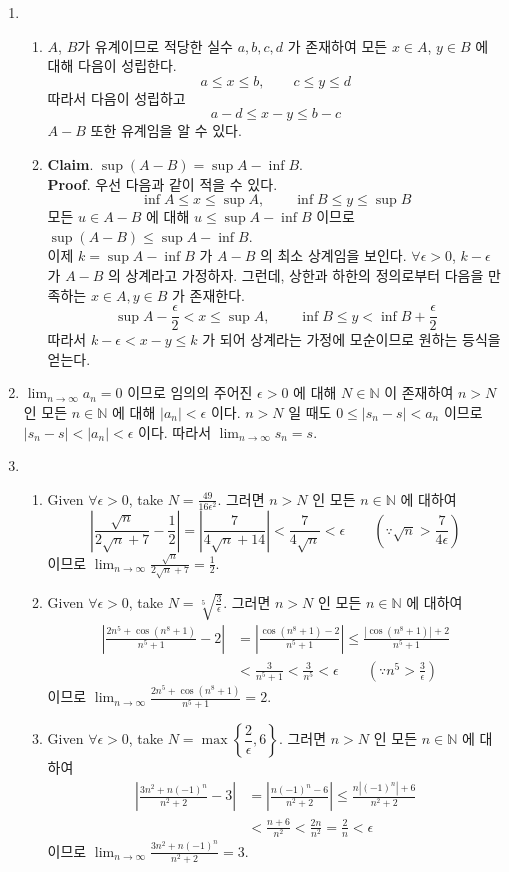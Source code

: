 \documentclass[12pt]{report}
\newcommand{\numl}[1]{\item[\large\textbf{\sffamily #1.}]}
\newcommand{\num}[1]{\item[\textbf{\sffamily #1}]}
\newcommand{\bb}[1]{\mathbb{#1}}
\newcommand{\ra}{\rightarrow}
\newcommand{\abs}[1]{\left|#1\right|}
\newcommand{\ds}{\displaystyle}
\begin{document}
\begin{enumerate}
\numl{3}
\begin{enumerate}
	\num{(1)} $A$, $B$가 유계이므로 적당한 실수 $a, b, c, d$ 가 존재하여 모든 $x \in A$, $y\in B$ 에 대해 다음이 성립한다. $$a\leq x\leq b, \qquad c\leq y\leq d$$ 따라서 다음이 성립하고 $$a-d\leq x-y\leq b-c$$ $A-B$ 또한 유계임을 알 수 있다.
	\num{(2)} \textbf{Claim}. $\sup(A-B) = \sup A-\inf B$.\\ \textbf{Proof}. 우선 다음과 같이 적을 수 있다. $$\inf A\leq x\leq \sup A, \qquad \inf B\leq y\leq \sup B$$ 모든 $u \in A-B$ 에 대해 $u \leq \sup A - \inf B$ 이므로 $\sup(A-B) \leq \sup A - \inf B$.\\ 이제 $k = \sup A - \inf B$ 가 $A-B$ 의 최소 상계임을 보인다. $\forall \epsilon > 0$, $k - \epsilon$ 가 $A-B$ 의 상계라고 가정하자. 그런데, 상한과 하한의 정의로부터 다음을 만족하는 $x \in A, y \in B$ 가 존재한다. $$\sup A - \frac{\epsilon}{2} < x \leq \sup A, \qquad \inf B \leq y < \inf B + \frac{\epsilon}{2}$$ 따라서 $k - \epsilon < x-y \leq k$ 가 되어 상계라는 가정에 모순이므로 원하는 등식을 얻는다.
\end{enumerate}

\numl{4} $\ds \lim_{n \ra \infty} a_n = 0$ 이므로 임의의 주어진 $\epsilon > 0$ 에 대해 $N\in\bb{N}$ 이 존재하여 $n>N$ 인 모든 $n\in \bb{N}$ 에 대해 $\abs{a_n} < \epsilon$ 이다. $n>N$ 일 때도 $0\leq\abs{s_n-s} < a_n$ 이므로 $\abs{s_n-s} < \abs{a_n} <\epsilon$ 이다. 따라서 $\ds \lim_{n \ra \infty} s_n = s$.

\numl{5}
\begin{enumerate}
	\num{(1)} Given $\forall \epsilon > 0$, take $N = \ds \frac{49}{16\epsilon^2}$. 그러면 $n>N$ 인 모든 $n\in\bb{N}$ 에 대하여\\
	$$\abs{\frac{\sqrt{n}}{2\sqrt{n}+7} - \frac{1}{2}} = \abs{\frac{7}{4\sqrt{n}+14}} < \frac{7}{4\sqrt{n}} < \epsilon \qquad \left(\because \sqrt{n} > \frac{7}{4\epsilon}\right)$$
	이므로 $\ds \lim_{n \ra \infty} \frac{\sqrt{n}}{2\sqrt{n}+7} = \frac{1}{2}$.

	\num{(2)} Given $\forall \epsilon > 0$, take $N = \ds \sqrt[5]{\frac{3}{\epsilon}}$. 그러면 $n>N$ 인 모든 $n\in\bb{N}$ 에 대하여\\
	$$\begin{aligned}
		\abs{\frac{2n^5 +\cos(n^8 +1)}{n^5+1} - 2} &= \abs{\frac{\cos(n^8+1) - 2}{n^5+1}} \leq \frac{\abs{\cos(n^8+1)} + 2}{n^5+1} \\&< \frac{3}{n^5+1} < \frac{3}{n^5} < \epsilon \qquad \left(\because n^5 > \frac{3}{\epsilon}\right)
	\end{aligned}$$
	이므로 $\ds \lim_{n \ra \infty} \frac{2n^5 +\cos(n^8 +1)}{n^5+1} = 2$.
	\num{(3)} Given $\forall \epsilon > 0$, take $N = \max\left\{\dfrac{2}{\epsilon}, 6\right\}$. 그러면 $n>N$ 인 모든 $n\in\bb{N}$ 에 대하여\\
	$$\begin{aligned}
		\abs{\frac{3n^2+n(-1)^n}{n^2+2} - 3} &= \abs{\frac{n(-1)^n - 6}{n^2+2}} \leq \frac{n\abs{(-1)^n} + 6}{n^2+2} \\&< \frac{n+6}{n^2} < \frac{2n}{n^2} = \frac{2}{n} < \epsilon
	\end{aligned}$$
	이므로 $\ds \lim_{n \ra \infty} \frac{3n^2+n(-1)^n}{n^2+2} = 3$.
\end{enumerate}


\end{enumerate}
\end{document}
